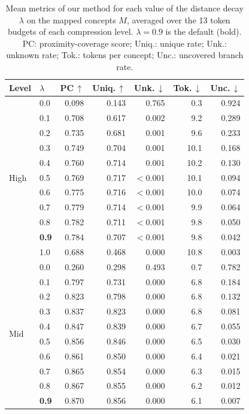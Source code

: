 \begin{table}[htbp]
\centering
\caption{Mean metrics of our method for each value of the distance decay $\lambda$ on the mapped concepts $M$, averaged over the 13 token budgets of each compression level. $\lambda = 0.9$ is the default (bold). PC: proximity-coverage score; Uniq.: unique rate; Unk.: unknown rate; Tok.: tokens per concept; Unc.: uncovered branch rate.}
\label{tab:lambda}
\footnotesize
\setlength{\tabcolsep}{4pt}
\begin{tabular}{@{}llrrrrr@{}}
\toprule
Level & $\lambda$ & PC\,$\uparrow$ & Uniq.\,$\uparrow$ & Unk.\,$\downarrow$ & Tok.\,$\downarrow$ & Unc.\,$\downarrow$ \\
\midrule
\multirow{11}{*}{High} & 0.0 & 0.098 & 0.143 & 0.765 & 0.3 & 0.924 \\
 & 0.1 & 0.708 & 0.617 & 0.002 & 9.2 & 0.289 \\
 & 0.2 & 0.735 & 0.681 & 0.001 & 9.6 & 0.233 \\
 & 0.3 & 0.749 & 0.704 & 0.001 & 10.1 & 0.168 \\
 & 0.4 & 0.760 & 0.714 & 0.001 & 10.2 & 0.130 \\
 & 0.5 & 0.769 & 0.717 & $<$0.001 & 10.1 & 0.094 \\
 & 0.6 & 0.775 & 0.716 & $<$0.001 & 10.0 & 0.074 \\
 & 0.7 & 0.779 & 0.714 & $<$0.001 & 9.9 & 0.064 \\
 & 0.8 & 0.782 & 0.711 & $<$0.001 & 9.8 & 0.050 \\
 & \textbf{0.9} & 0.784 & 0.707 & $<$0.001 & 9.8 & 0.042 \\
 & 1.0 & 0.688 & 0.468 & 0.000 & 10.8 & 0.003 \\
\midrule
\multirow{11}{*}{Mid} & 0.0 & 0.260 & 0.298 & 0.493 & 0.7 & 0.782 \\
 & 0.1 & 0.797 & 0.731 & 0.000 & 6.8 & 0.184 \\
 & 0.2 & 0.823 & 0.798 & 0.000 & 6.8 & 0.132 \\
 & 0.3 & 0.837 & 0.823 & 0.000 & 6.8 & 0.081 \\
 & 0.4 & 0.847 & 0.839 & 0.000 & 6.7 & 0.055 \\
 & 0.5 & 0.856 & 0.846 & 0.000 & 6.5 & 0.030 \\
 & 0.6 & 0.861 & 0.850 & 0.000 & 6.4 & 0.021 \\
 & 0.7 & 0.865 & 0.854 & 0.000 & 6.3 & 0.015 \\
 & 0.8 & 0.867 & 0.855 & 0.000 & 6.2 & 0.012 \\
 & \textbf{0.9} & 0.870 & 0.856 & 0.000 & 6.1 & 0.007 \\

\end{tabular}
\end{table}
